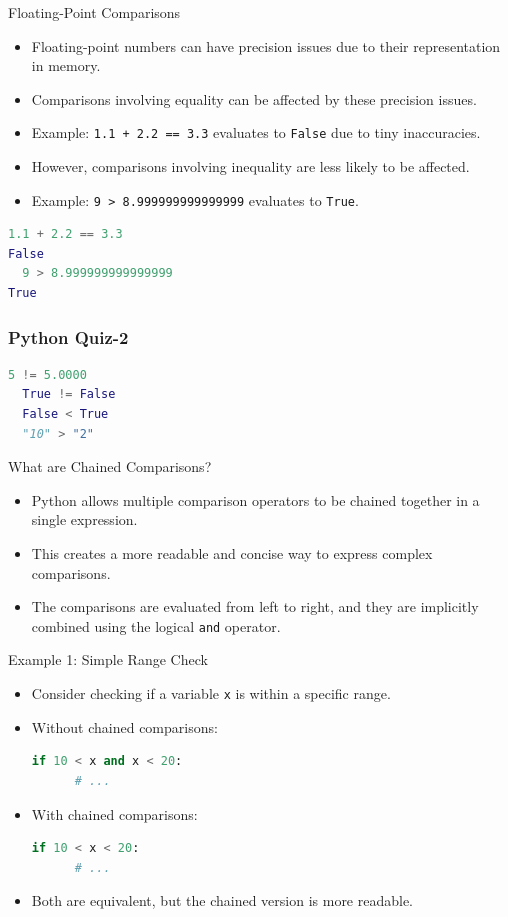 \begin{frame}[fragile]{Floating-Point Comparisons}
    \begin{itemize}
        \item Floating-point numbers can have precision issues due to their representation in memory.
        \item Comparisons involving equality can be affected by these precision issues.
        \item Example: \texttt{1.1 + 2.2 == 3.3} evaluates to \texttt{False} due to tiny inaccuracies.
        \item However, comparisons involving inequality are less likely to be affected.
        \item Example: \texttt{9 > 8.999999999999999} evaluates to \texttt{True}.
    \end{itemize}
    \begin{lstlisting}[language=Python]
  1.1 + 2.2 == 3.3
False
  9 > 8.999999999999999
True
    \end{lstlisting}
\end{frame}

\begin{frame}[fragile]
    \frametitle{Python Quiz-2}
    \begin{lstlisting}[language=Python]
  5 != 5.0000
  True != False
  False < True
  "10" > "2"
    \end{lstlisting}
\end{frame}


\begin{frame}{What are Chained Comparisons?}
    \begin{itemize}
      \item Python allows multiple comparison operators to be chained together in a single expression.
      \item This creates a more readable and concise way to express complex comparisons.
      \item The comparisons are evaluated from left to right, and they are implicitly combined using the logical \texttt{and} operator.
    \end{itemize}
  \end{frame}
  
  \begin{frame}[fragile]{Example 1: Simple Range Check}
    \begin{itemize}
      \item Consider checking if a variable \texttt{x} is within a specific range.
      \item Without chained comparisons:
        \begin{lstlisting}[language=Python]
  if 10 < x and x < 20:
      # ...
        \end{lstlisting}
      \item With chained comparisons:
        \begin{lstlisting}[language=Python]
  if 10 < x < 20:
      # ...
        \end{lstlisting}
      \item Both are equivalent, but the chained version is more readable.
    \end{itemize}
  \end{frame}
  
